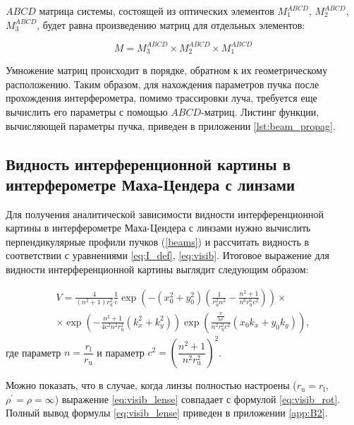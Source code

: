 $ABCD$ матрица системы, состоящей из оптических элементов $M_1^{ABCD}$, $M_2^{ABCD}$, $M_3^{ABCD}$, будет равна произведению матриц для отдельных элементов:

\begin{equation}
    M = M_3^{ABCD} \times M_2^{ABCD} \times M_1^{ABCD}
\label{eq:abcd_prod}
\end{equation}

Умножение матриц происходит в порядке, обратном к их геометрическому расположению. Таким образом, для нахождения параметров пучка после прохождения интерферометра, помимо трассировки луча, требуется еще вычислить его параметры с помощью $ABCD$-матриц. Листинг функции, вычисляющей параметры пучка, приведен в приложении \ref{lst:beam_propag}.

\subsection{Видность интерференционной картины в интерферометре Маха-Цендера с линзами}\label{sec:ch2/sec1/subsec5}

Для получения аналитической зависимости видности интерференционной картины в интерферометре Маха-Цендера с линзами нужно вычислить перпендикулярные профили пучков  (\ref{beams}) и рассчитать видность в соответствии с уравнениями \eqref{eq:I_def}, \eqref{eq:visib}. Итоговое выражение для видности интерференционной картины выглядит следующим образом:

\begin{equation}
\begin{split}
    V =\frac{4}{\left(n^{2}+1\right) r_{\mathrm{u}}^{2}} \frac{1}{c} \exp \left(-\left(x_{0}^{2}+y_{0}^{2}\right)\left(\frac{1}{r_{\mathrm{u}}^{2} n^{2}}-\frac{n^{2}+1}{n^{6} r_{\mathrm{u}}^{6} c^{2}}\right)\right) \times \\ \times \exp \left(-\frac{n^{2}+1}{4 c^{2} n^{2} r_{\mathrm{u}}^{2}}\left(k_{x}^{2}+k_{y}^{2}\right)\right) \exp \left(\frac{\frac{\pi}{\lambda \rho^{\prime}}}{n^{2} r_{\mathrm{u}}^{2} c^{2}}\left(x_{0} k_{x}+y_{0} k_{y}\right)\right),
\end{split}
\label{eq:visib_lense}
\end{equation}
где параметр $n=\dfrac{r_{\mathrm{l}}}{r_{\mathrm{u}}}$ и параметр $c^2 = (\dfrac{n^2 + 1}{n^2r^2_{\mathrm{u}}})^2$.

Можно показать, что в случае, когда линзы полностью настроены ($r_{\mathrm{u}} = r_{\mathrm{l}}$, $\rho^{\prime} = \rho = \infty$) выражение \eqref{eq:visib_lense} совпадает с формулой \eqref{eq:visib_rot}. Полный вывод формулы \eqref{eq:visib_lense} приведен в приложении \ref{app:B2}.

